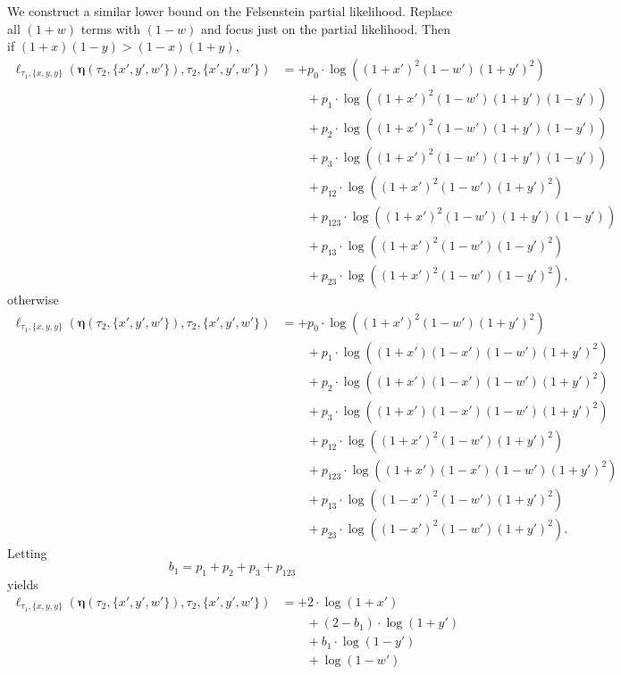 \documentclass[a4paper]{article}
\newcommand{\fullAncestralSplitPartitions}{\boldsymbol\eta}
\begin{document}
We construct a similar lower bound on the Felsenstein partial likelihood.
Replace all $(1+w)$ terms with $(1-w)$ and focus just on the partial likelihood.
Then if $(1+x)(1-y) > (1-x)(1+y)$,
\begin{align*}
    \ell_{\tau_1,\{x,y,y\}}(\fullAncestralSplitPartitions(\tau_2,\{x',y',w'\}),\tau_2,\{x',y',w'\})
    &=      + p_{0}  \cdot\log((1+x')^2   (1-w')(1+y')^2) \\
    &\qquad + p_{1}  \cdot\log((1+x')^2   (1-w')(1+y')(1-y')) \\
    &\qquad + p_{2}  \cdot\log((1+x')^2   (1-w')(1+y')(1-y')) \\
    &\qquad + p_{3}  \cdot\log((1+x')^2   (1-w')(1+y')(1-y')) \\
    &\qquad + p_{12} \cdot\log((1+x')^2   (1-w')(1+y')^2) \\
    &\qquad + p_{123}\cdot\log((1+x')^2   (1-w')(1+y')(1-y'))\\
    &\qquad + p_{13} \cdot\log((1+x')^2   (1-w')(1-y')^2) \\
    &\qquad + p_{23} \cdot\log((1+x')^2   (1-w')(1-y')^2),
\end{align*}
otherwise
\begin{align*}
    \ell_{\tau_1,\{x,y,y\}}(\fullAncestralSplitPartitions(\tau_2,\{x',y',w'\}),\tau_2,\{x',y',w'\})
    &=      + p_{0}  \cdot\log((1+x')^2    (1-w')(1+y')^2) \\
    &\qquad + p_{1}  \cdot\log((1+x')(1-x')(1-w')(1+y')^2) \\
    &\qquad + p_{2}  \cdot\log((1+x')(1-x')(1-w')(1+y')^2) \\
    &\qquad + p_{3}  \cdot\log((1+x')(1-x')(1-w')(1+y')^2) \\
    &\qquad + p_{12} \cdot\log((1+x')^2    (1-w')(1+y')^2) \\
    &\qquad + p_{123}\cdot\log((1+x')(1-x')(1-w')(1+y')^2)\\
    &\qquad + p_{13} \cdot\log((1-x')^2    (1-w')(1+y')^2) \\
    &\qquad + p_{23} \cdot\log((1-x')^2    (1-w')(1+y')^2).
\end{align*}
Letting
$$
b_{1} = p_{1}+p_{2}+p_{3}+p_{123}
$$
yields
\begin{align*}
    \ell_{\tau_1,\{x,y,y\}}(\fullAncestralSplitPartitions(\tau_2,\{x',y',w'\}),\tau_2,\{x',y',w'\})
    &=      + 2\cdot\log(1+x') \\
    &\qquad + (2-b_{1})  \cdot\log(1+y') \\
    &\qquad + b_{1}      \cdot\log(1-y') \\
    &\qquad + \log(1-w')
\end{align*}
\end{document}
